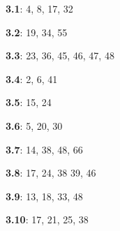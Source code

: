 \documentclass{siproblemset}
\begin{document}
        \textbf{3.1}: 4, 8, 17, 32
        
        \textbf{3.2}: 19, 34, 55
        
        \textbf{3.3}: 23, 36, 45, 46, 47, 48
        
        \textbf{3.4}: 2, 6, 41
        
        \textbf{3.5}: 15, 24
        
        \textbf{3.6}: 5, 20, 30
        
        \textbf{3.7}: 14, 38, 48, 66
        
        \textbf{3.8}: 17, 24, 38 39, 46
        
        \textbf{3.9}: 13, 18, 33, 48
        
        \textbf{3.10}: 17, 21, 25, 38
%        
%        
%        
%        
%        
%        
%        
%        
%        
%        
%        
%        
%        
%        
%        
%        
%        
%        
    
\end{document}
